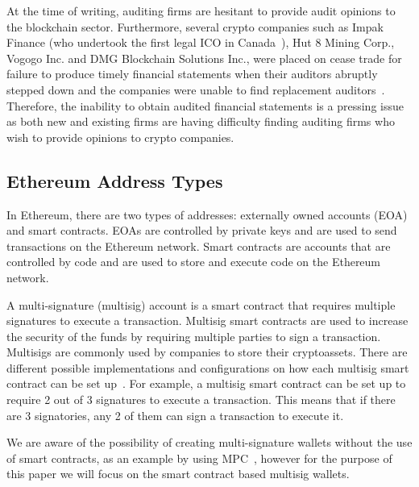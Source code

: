 At the time of writing, auditing firms are hesitant to provide audit opinions to the blockchain sector. Furthermore, several crypto companies such as Impak Finance (who undertook the first legal ICO in Canada~\cite{AMFImpactFinance}), Hut 8 Mining Corp., Vogogo Inc. and DMG Blockchain Solutions Inc., were placed on cease trade for failure to produce timely financial statements when their auditors abruptly stepped down and the companies were unable to find replacement auditors~\cite{posadzki2019crypto}. Therefore, the inability to obtain audited financial statements is a pressing issue as both new and existing firms are having difficulty finding auditing firms who wish to provide opinions to crypto companies.






\subsection{Ethereum Address Types}
In Ethereum, there are two types of addresses: externally owned accounts (EOA) and smart contracts. EOAs are controlled by private keys and are used to send transactions on the Ethereum network. Smart contracts are accounts that are controlled by code and are used to store and execute code on the Ethereum network. 



A multi-signature (multisig) account is a smart contract that requires multiple signatures to execute a transaction. Multisig smart contracts are used to increase the security of the funds by requiring multiple parties to sign a transaction. Multisigs are commonly used by companies to store their cryptoassets. There are different possible implementations and configurations on how each multisig smart contract can be set up~\cite{ittay2021wallet}. For example, a multisig smart contract can be set up to require 2 out of 3 signatures to execute a transaction. This means that if there are 3 signatories, any 2 of them can sign a transaction to execute it.

We are aware of the possibility of creating multi-signature wallets without the use of smart contracts, as an example by using MPC~\cite{zhao2019secure}, however for the purpose of this paper we will focus on the smart contract based multisig wallets.

